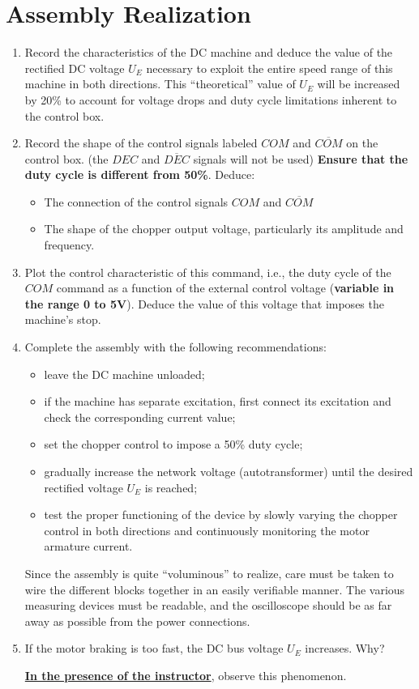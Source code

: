 \newpage
\section{Assembly Realization}

\begin{enumerate}
\item Record the characteristics of the DC machine and deduce the value of the rectified DC voltage $U_E$ necessary to exploit the entire speed range of this machine in both directions. This ``theoretical'' value of $U_E$ will be increased by 20\% to account for voltage drops and duty cycle limitations inherent to the control box.

\item Record the shape of the control signals labeled $COM$ and $\overline{COM}$ on the control box. (the $DEC$ and $\overline{DEC}$ signals will not be used) \textbf{Ensure that the duty cycle is different from 50\%}. Deduce:
\begin{itemize}
\item The connection of the control signals $COM$ and $\overline{COM}$
\item The shape of the chopper output voltage, particularly its amplitude and frequency.
\end{itemize}

\item Plot the control characteristic of this command, i.e., the duty cycle of the $COM$ command as a function of the external control voltage (\textbf{variable in the range 0 to 5V}). Deduce the value of this voltage that imposes the machine's stop.

\item Complete the assembly with the following recommendations:
\begin{itemize}
\item leave the DC machine unloaded;
\item if the machine has separate excitation, first connect its excitation and check the corresponding current value;
\item set the chopper control to impose a 50\% duty cycle;
\item gradually increase the network voltage (autotransformer) until the desired rectified voltage $U_E$ is reached;
\item test the proper functioning of the device by slowly varying the chopper control in both directions and continuously monitoring the motor armature current.
\end{itemize}

Since the assembly is quite ``voluminous'' to realize, care must be taken to wire the different blocks together in an easily verifiable manner. The various measuring devices must be readable, and the oscilloscope should be as far away as possible from the power connections.

\item If the motor braking is too fast, the DC bus voltage $U_E$ increases. Why? 

\underline{\textbf{In the presence of the instructor}}, observe this phenomenon.
\end{enumerate}

